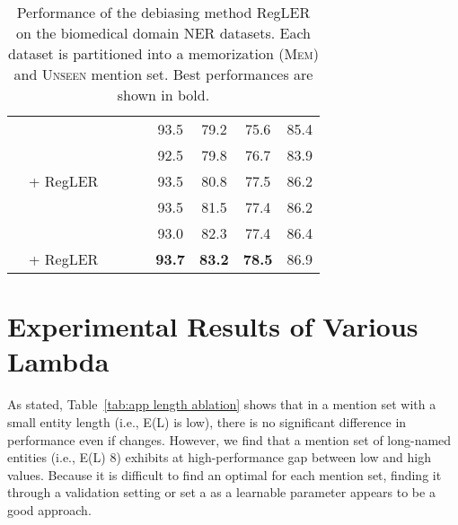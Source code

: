 \documentclass[11pt]{article}
\newcommand{\cmark}{\ding{51}}\newcommand{\xmark}{\ding{55}}\newcommand{\cross}{\ding{61}}\newcommand{\mb}[1]{\textcolor{red}{#1}}
\begin{document}
\begin{table*}[t]
\begin{adjustbox}{width=0.75\textwidth}
\begin{tabular}{ l l c c c c c c c }
\cmidrule{2-9}
&  & \xmark & \xmark & \xmark & 93.5 & 79.2 & 75.6 & 85.4 \\
&  & \xmark & \xmark & \xmark & 92.5 & 79.8 & 76.7 & 83.9 \\
&  + RegLER & \cmark & \cmark & \cmark & 93.5 & 80.8 & 77.5 & 86.2 \\
\cmidrule{2-9}
&  & \xmark & \xmark & \xmark & 93.5 & 81.5 & 77.4 & 86.2 \\
&  & \xmark & \xmark & \xmark & 93.0 & 82.3 & 77.4 & 86.4 \\
&  + RegLER & \cmark & \cmark & \cmark & \textbf{93.7} & \textbf{83.2} & \textbf{78.5} & 86.9 \\
\bottomrule
\end{tabular}
\end{adjustbox}
\caption{Performance of the debiasing method RegLER on the biomedical domain NER datasets. Each dataset is partitioned into a memorization (\textsc{Mem}) and \textsc{Unseen} mention set. Best performances are shown in bold.}
\label{tab:maintable 4}
\end{table*}


\section{Experimental Results of Various Lambda}
\label{app:lambda results}

As stated, Table~\ref{tab:app length ablation} shows that in a mention set with a small entity length (i.e., E(L) is low), there is no significant difference in performance even if  changes.
However, we find that a mention set of long-named entities (i.e., E(L)  8) exhibits at high-performance gap between low  and high  values.
Because it is difficult to find an optimal  for each mention set, finding it through a validation setting or set a  as a learnable parameter appears to be a good approach.
\end{document}
